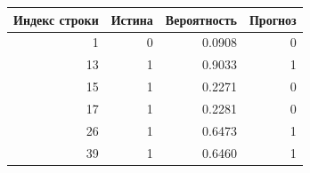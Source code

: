 \begin{tabular}{rrrr}
\toprule
Индекс строки & Истина & Вероятность & Прогноз \\
\midrule
1 & 0 & 0.0908 & 0 \\
13 & 1 & 0.9033 & 1 \\
15 & 1 & 0.2271 & 0 \\
17 & 1 & 0.2281 & 0 \\
26 & 1 & 0.6473 & 1 \\
39 & 1 & 0.6460 & 1 \\
\bottomrule
\end{tabular}
